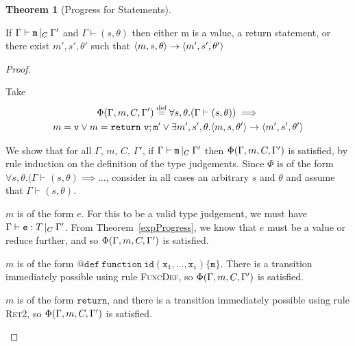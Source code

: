 \documentclass[a4paper]{article}
\theoremstyle{definition}
\theoremstyle{dotless}
\newtheorem{theorem}{Theorem}[section]
\begin{document}
\begin{theorem}[Progress for Statements]\label{statProgress}

  If $\Gamma{}\vdash\mathtt{m}\, |_C \:\Gamma '$ and $\Gamma \vdash (s, \theta)$ then either m is a
  value, a return statement, or there exist $m',s', \theta'$ such that
  $\langle{}m,s,\theta\rangle{}\rightarrow{}\langle{}m',s',\theta'\rangle$

\end{theorem}

\begin{proof}\label{statProgressProof}

  Take 
  \begin{multline*}
  	\Phi(\Gamma, m, C, \Gamma') \stackrel{\text{def}}{=} 
  	\forall s,\theta. (\Gamma \vdash (s,\theta))\implies \\
  	m=\mathtt{v} \vee m=\mathtt{return\ v; m'} \vee
  	\exists m', s',\theta. \langle{}m,s,\theta'\rangle{}\rightarrow{}\langle{}m',s',\theta'\rangle
  \end{multline*}

  We show that for all $\Gamma$, $m$, $C$, $\Gamma'$, if $\Gamma{}\vdash\mathtt{m}\, |_C \:\Gamma '$
  then $\Phi(\Gamma, m, C, \Gamma')$ is satisfied, by rule induction on the definition of the
  type judgements. Since $\Phi$ is of the form
  $\forall s,\theta.(\Gamma\vdash(s,\theta)\implies\dots$,
  consider in all cases an arbitrary $s$ and $\theta$ and assume that $\Gamma\vdash(s,\theta)$.

  \begin{case}[ExpTypable]\label{expTypable}

	$m$ is of the form $e$. For this to be a valid type judgement, we must have
	$\Gamma{}\vdash\mathtt{e}: T\,|_C\:\Gamma'$. From Theorem~\ref{expProgress}, we know that $e$ must be a
	value or reduce further, and so $\Phi(\Gamma, m, C, \Gamma')$ is satisfied.

  \end{case}

  \begin{case}[FunDef]\label{funDef}

	$m$ is of the form $\mathtt{@def\ function\ id(x_1, \dots, x_i)\{m\}}$. There
	is a transition immediately possible using rule \textsc{FuncDef}, so $\Phi(\Gamma, m, C, \Gamma')$
	is satisfied.

  \end{case}

  \begin{case}[RetTypable1]\label{retTypable1}

  	$m$ is of the form $\mathtt{return}$, and there is a transition immediately
  	possible using rule \textsc{Ret2}, so $\Phi(\Gamma, m, C, \Gamma')$ is satisfied. 


\end{case}
\end{proof}
\end{document}
